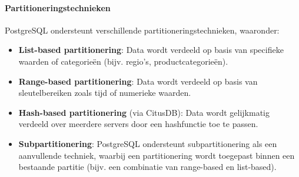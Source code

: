 \paragraph{Partitioneringstechnieken}  
PostgreSQL ondersteunt verschillende partitioneringstechnieken, waaronder:
\begin{itemize}
    \item \textbf{List-based partitionering}: Data wordt verdeeld op basis van specifieke waarden of categorieën (bijv. regio's, productcategorieën).
    \item \textbf{Range-based partitionering}: Data wordt verdeeld op basis van sleutelbereiken zoals tijd of numerieke waarden.
    \item \textbf{Hash-based partitionering} (via CitusDB): Data wordt gelijkmatig verdeeld over meerdere servers door een hashfunctie toe te passen.
    \item \textbf{Subpartitionering}: PostgreSQL ondersteunt subpartitionering als een aanvullende techniek, waarbij een partitionering wordt toegepast binnen een bestaande partitie (bijv. een combinatie van range-based en list-based).
\end{itemize}

\begin{table}[h]
    \centering
    \caption{Overzicht van de specificaties van PostgreSQL. \autocite{PostgreSQLDocumentation}}
\end{table}

